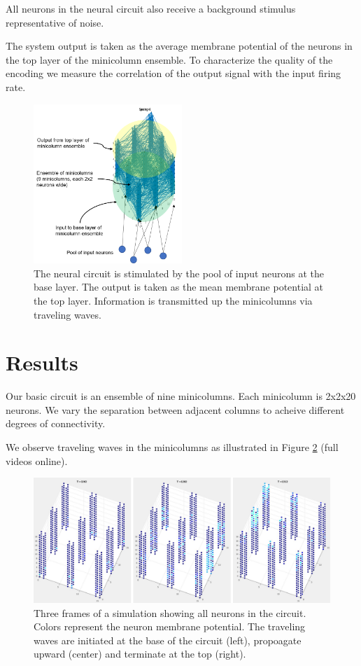 \documentclass[a4paper,11pt]{article}
\begin{document}
All neurons in the neural circuit also receive a background stimulus representative of noise.

The system output is taken as the average membrane potential of the neurons in the top layer of the minicolumn ensemble.
To characterize the quality of the encoding we measure the correlation of the output signal with the input firing rate.

\begin{figure}[!ht]
 \caption{The neural circuit is stimulated by the pool of input neurons at the base layer. The output is taken as the mean membrane potential at the top layer. Information is transmitted up the minicolumns via traveling waves. }
 \label{fig:system_diagram}
 \centering
   \includegraphics[width=0.5\textwidth]{fig/SystemDiagram}
\end{figure}


\clearpage
\section{Results}
Our basic circuit is an ensemble of nine minicolumns. 
Each minicolumn is 2x2x20 neurons. 
We vary the separation between adjacent columns to acheive different degrees of connectivity.

We observe traveling waves in the minicolumns as illustrated in Figure \ref{fig:firing_video} (full videos online).
\begin{figure}[!ht]
 \caption{Three frames of a simulation showing all neurons in the circuit. Colors represent the neuron membrane potential. The traveling waves are initiated at the base of the circuit (left), propoagate upward (center) and terminate at the top (right).} 
 \label{fig:firing_video}
 \centering
   \includegraphics[width=\textwidth]{fig/VideoStills}
\end{figure}
\end{document}
